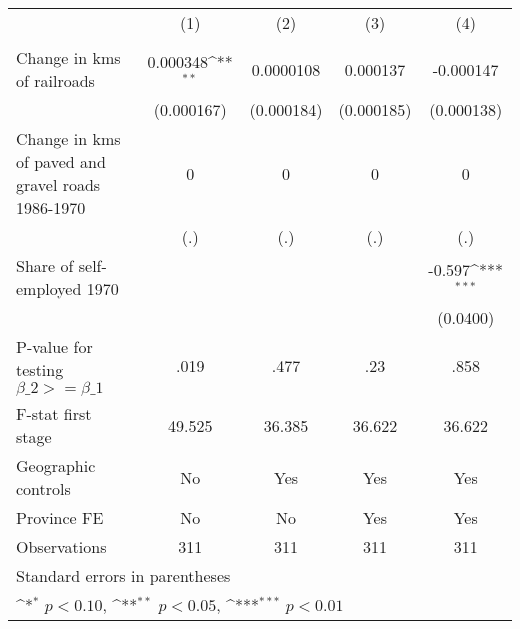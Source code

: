 {
\def\sym#1{\ifmmode^{#1}\else\(^{#1}\)\fi}
\begin{tabular}{l*{4}{c}}
\hline\hline
                &\multicolumn{1}{c}{(1)}&\multicolumn{1}{c}{(2)}&\multicolumn{1}{c}{(3)}&\multicolumn{1}{c}{(4)}\\
                &\multicolumn{1}{c}{}&\multicolumn{1}{c}{}&\multicolumn{1}{c}{}&\multicolumn{1}{c}{}\\
\hline
Change in kms of railroads& 0.000348\sym{**} &0.0000108         & 0.000137         &-0.000147         \\
                &(0.000167)         &(0.000184)         &(0.000185)         &(0.000138)         \\
[1em]
Change in kms of paved and gravel roads 1986-1970&        0         &        0         &        0         &        0         \\
                &      (.)         &      (.)         &      (.)         &      (.)         \\
[1em]
Share of self-employed 1970&                  &                  &                  &   -0.597\sym{***}\\
                &                  &                  &                  & (0.0400)         \\
\hline
P-value for testing $\beta\_{2} >= \beta\_{1}$&     .019         &     .477         &      .23         &     .858         \\
F-stat first stage&   49.525         &   36.385         &   36.622         &   36.622         \\
Geographic controls&       No         &      Yes         &      Yes         &      Yes         \\
Province FE     &       No         &       No         &      Yes         &      Yes         \\
Observations    &      311         &      311         &      311         &      311         \\
\hline\hline
\multicolumn{5}{l}{\footnotesize Standard errors in parentheses}\\
\multicolumn{5}{l}{\footnotesize \sym{*} \(p<0.10\), \sym{**} \(p<0.05\), \sym{***} \(p<0.01\)}\\
\end{tabular}
}
